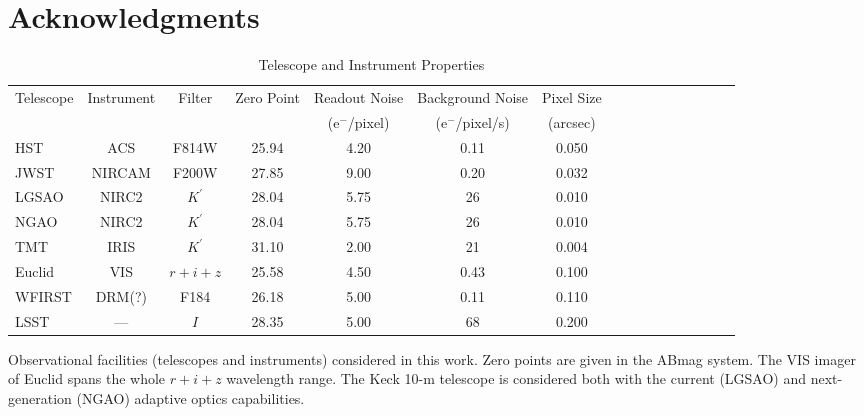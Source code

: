 \documentclass[a4paper,11pt]{article}
\begin{document}
\section*{Acknowledgments}










\clearpage
\begin{table}\footnotesize
\begin{center}
\caption{Telescope and Instrument Properties}
\begin{tabular}{lccccccccccccccc|}
\hline \hline
Telescope & Instrument & Filter & Zero Point & Readout Noise & Background Noise & Pixel Size \\
 & & & & (e$^-$/pixel) & (e$^-$/pixel/s) & (arcsec) \\
\hline
  HST    & ACS    &   F814W     &  25.94  & 4.20   &    0.11    &     0.050    \\
  JWST   & NIRCAM &   F200W     &  27.85  & 9.00   &    0.20    &     0.032  \\
  LGSAO  & NIRC2  &   $K^\prime$&  28.04  & 5.75   &      26    &     0.010      \\
  NGAO   & NIRC2  &   $K^\prime$&  28.04  & 5.75   &      26    &     0.010     \\
  TMT    & IRIS   &   $K^\prime$&  31.10  & 2.00   &      21    &     0.004  \\
  Euclid & VIS    &   $r+i+z$   &  25.58  & 4.50   &    0.43    &     0.100   \\
  WFIRST & DRM(?) &   F184      &  26.18  & 5.00   &    0.11    &     0.110   \\
  LSST   & ---    &   $I$       &  28.35  & 5.00   &      68    &     0.200  \\
\hline
\hline
\end{tabular}
\begin{tablenotes}
\item 
Observational facilities (telescopes and instruments) considered in this work.
 Zero points are given in the ABmag system. The VIS imager of Euclid spans the whole $r+i+z$ wavelength range. The Keck 10-m telescope is considered both with the current (LGSAO) and next-generation (NGAO) adaptive optics capabilities.\\
\end{tablenotes}
\label{tab:telescopes parameters}
\end{center}
\end{table}
\end{document}
